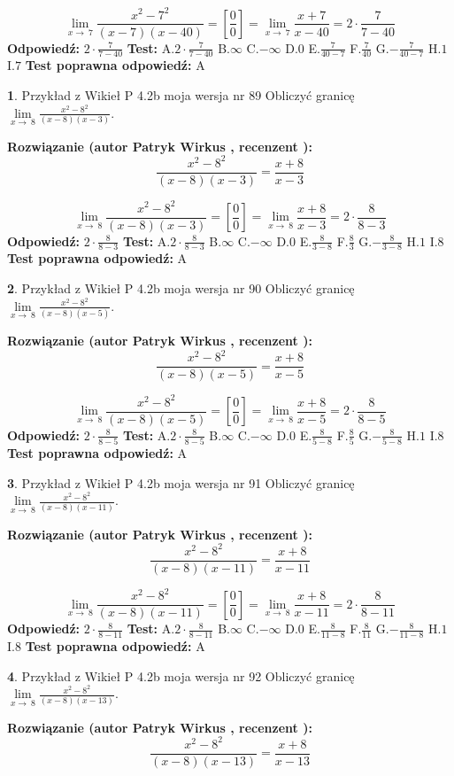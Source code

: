 \documentclass[12pt, a4paper]{article}
\theoremstyle{definition} %
\newtheorem{zad}{}
\newcommand{\zadStart}[1]{\begin{zad}#1\newline}
\newcommand{\zadStop}{\end{zad}}
\newcommand{\rozwStart}[2]{\noindent \textbf{Rozwiązanie (autor #1 , recenzent #2): }\newline}
\newcommand{\rozwStop}{\newline}
\newcommand{\odpStart}{\noindent \textbf{Odpowiedź:}\newline}
\newcommand{\odpStop}{\newline}
\newcommand{\testStart}{\noindent \textbf{Test:}\newline}
\newcommand{\testStop}{\newline}
\newcommand{\kluczStart}{\noindent \textbf{Test poprawna odpowiedź:}\newline}
\newcommand{\kluczStop}{\newline}
\begin{document}
$$\lim\limits_{x\to\ 7}\frac{x^{2}-7^{2}}{(x-7)(x-40)}=[\frac{0}{0}]=\lim\limits_{x\to\ 7}\frac{x+7}{x-40}=2 \cdot \frac{7}{7-40}$$
\rozwStop
\odpStart
$2 \cdot \frac{7}{7-40}$
\odpStop
\testStart
A.$2 \cdot \frac{7}{7-40}$
B.$\infty$
C.$-\infty$
D.$0$
E.$\frac{7}{40-7}$
F.$\frac{7}{40}$
G.$-\frac{7}{40-7}$
H.$1$
I.$7$
\testStop
\kluczStart
A
\kluczStop



\zadStart{Przykład z Wikieł P 4.2b moja wersja nr 89}
Obliczyć granicę $\lim\limits_{x\to\ 8}\frac{x^{2}-8^{2}}{(x-8)(x-3)}$.
\zadStop
\rozwStart{Patryk Wirkus}{}
$$\frac{x^{2}-8^{2}}{(x-8)(x-3)}=\frac{x+8}{x-3}$$

$$\lim\limits_{x\to\ 8}\frac{x^{2}-8^{2}}{(x-8)(x-3)}=[\frac{0}{0}]=\lim\limits_{x\to\ 8}\frac{x+8}{x-3}=2 \cdot \frac{8}{8-3}$$
\rozwStop
\odpStart
$2 \cdot \frac{8}{8-3}$
\odpStop
\testStart
A.$2 \cdot \frac{8}{8-3}$
B.$\infty$
C.$-\infty$
D.$0$
E.$\frac{8}{3-8}$
F.$\frac{8}{3}$
G.$-\frac{8}{3-8}$
H.$1$
I.$8$
\testStop
\kluczStart
A
\kluczStop



\zadStart{Przykład z Wikieł P 4.2b moja wersja nr 90}
Obliczyć granicę $\lim\limits_{x\to\ 8}\frac{x^{2}-8^{2}}{(x-8)(x-5)}$.
\zadStop
\rozwStart{Patryk Wirkus}{}
$$\frac{x^{2}-8^{2}}{(x-8)(x-5)}=\frac{x+8}{x-5}$$

$$\lim\limits_{x\to\ 8}\frac{x^{2}-8^{2}}{(x-8)(x-5)}=[\frac{0}{0}]=\lim\limits_{x\to\ 8}\frac{x+8}{x-5}=2 \cdot \frac{8}{8-5}$$
\rozwStop
\odpStart
$2 \cdot \frac{8}{8-5}$
\odpStop
\testStart
A.$2 \cdot \frac{8}{8-5}$
B.$\infty$
C.$-\infty$
D.$0$
E.$\frac{8}{5-8}$
F.$\frac{8}{5}$
G.$-\frac{8}{5-8}$
H.$1$
I.$8$
\testStop
\kluczStart
A
\kluczStop



\zadStart{Przykład z Wikieł P 4.2b moja wersja nr 91}
Obliczyć granicę $\lim\limits_{x\to\ 8}\frac{x^{2}-8^{2}}{(x-8)(x-11)}$.
\zadStop
\rozwStart{Patryk Wirkus}{}
$$\frac{x^{2}-8^{2}}{(x-8)(x-11)}=\frac{x+8}{x-11}$$

$$\lim\limits_{x\to\ 8}\frac{x^{2}-8^{2}}{(x-8)(x-11)}=[\frac{0}{0}]=\lim\limits_{x\to\ 8}\frac{x+8}{x-11}=2 \cdot \frac{8}{8-11}$$
\rozwStop
\odpStart
$2 \cdot \frac{8}{8-11}$
\odpStop
\testStart
A.$2 \cdot \frac{8}{8-11}$
B.$\infty$
C.$-\infty$
D.$0$
E.$\frac{8}{11-8}$
F.$\frac{8}{11}$
G.$-\frac{8}{11-8}$
H.$1$
I.$8$
\testStop
\kluczStart
A
\kluczStop



\zadStart{Przykład z Wikieł P 4.2b moja wersja nr 92}
Obliczyć granicę $\lim\limits_{x\to\ 8}\frac{x^{2}-8^{2}}{(x-8)(x-13)}$.
\zadStop
\rozwStart{Patryk Wirkus}{}
$$\frac{x^{2}-8^{2}}{(x-8)(x-13)}=\frac{x+8}{x-13}$$
\end{document}
